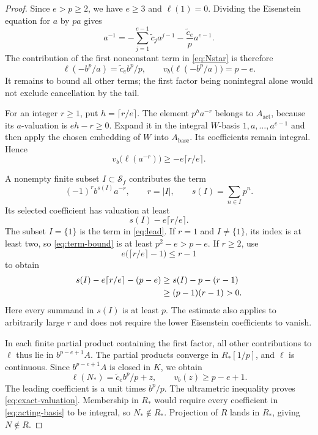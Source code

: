 \documentclass[11pt]{article}
\theoremstyle{definition}\newtheorem{definition}[theorem]{Definition}
\theoremstyle{remark}\newtheorem{remark}[theorem]{Remark}
\newcommand{\act}{\mathrm{act}}
\newcommand{\base}{\mathrm{base}}
\begin{document}
\begin{proof}
Since $e>p\ge2$, we have $e\ge3$ and $\ell(1)=0$. Dividing the Eisenstein equation for $a$ by $pa$ gives
\begin{equation}\label{eq:ainverse}
 a^{-1}=-\sum_{j=1}^{e-1}\widetilde c_j a^{j-1}
          -\frac{\widetilde c_e}{p}a^{e-1}.
\end{equation}
The contribution of the first nonconstant term in \eqref{eq:Nstar} is therefore
\begin{equation}\label{eq:lead}
 \ell(-b^p/a)=\widetilde c_e b^p/p,
 \qquad v_b\bigl(\ell(-b^p/a)\bigr)=p-e.
\end{equation}
It remains to bound all other terms; the first factor being nonintegral alone would not exclude cancellation by the tail.

For an integer $r\ge1$, put $h=\lceil r/e\rceil$. The element $p^ha^{-r}$ belongs to $A_{\act}$, because its $a$-valuation is $eh-r\ge0$. Expand it in the integral $W$-basis $1,a,\ldots,a^{e-1}$ and then apply the chosen embedding of $W$ into $A_{\base}$. Its coefficients remain integral. Hence
\begin{equation}\label{eq:coeff-bound}
 v_b\bigl(\ell(a^{-r})\bigr)\ge-e\lceil r/e\rceil.
\end{equation}

A nonempty finite subset $I\subset\mathcal S_f$ contributes the term
\[
 (-1)^r b^{s(I)}a^{-r},\qquad
 r=|I|,\qquad s(I)=\sum_{n\in I}p^n.
\]
Its selected coefficient has valuation at least
\begin{equation}\label{eq:term-bound}
 s(I)-e\lceil r/e\rceil.
\end{equation}
The subset $I=\{1\}$ is the term in \eqref{eq:lead}. If $r=1$ and $I\ne\{1\}$, its index is at least two, so \eqref{eq:term-bound} is at least $p^2-e>p-e$. If $r\ge2$, use
\[
 e\bigl(\lceil r/e\rceil-1\bigr)\le r-1
\]
to obtain
\begin{align}\label{eq:strict-bound}
 s(I)-e\lceil r/e\rceil-(p-e)
 &\ge s(I)-p-(r-1)\notag\\
 &\ge(p-1)(r-1)>0.
\end{align}
Here every summand in $s(I)$ is at least $p$. The estimate also applies to arbitrarily large $r$ and does not require the lower Eisenstein coefficients to vanish.

In each finite partial product containing the first factor, all other contributions to $\ell$ thus lie in $b^{p-e+1}A$. The partial products converge in $R_*[1/p]$, and $\ell$ is continuous. Since $b^{p-e+1}A$ is closed in $K$, we obtain
\[
 \ell(N_*)=\widetilde c_e b^p/p+z,
 \qquad v_b(z)\ge p-e+1.
\]
The leading coefficient is a unit times $b^p/p$. The ultrametric inequality proves \eqref{eq:exact-valuation}. Membership in $R_*$ would require every coefficient in \eqref{eq:acting-basis} to be integral, so $N_*\notin R_*$. Projection of $R$ lands in $R_*$, giving $N\notin R$.
\end{proof}
\end{document}
